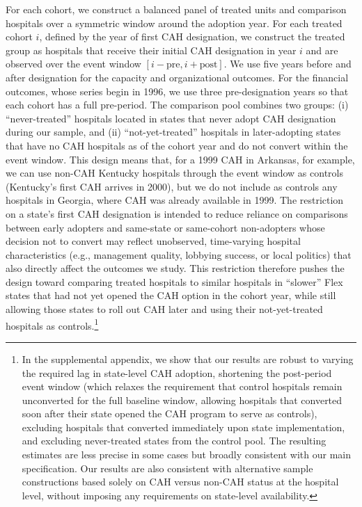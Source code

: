 \documentclass[a4paper, 12pt, twoside]{article}
\begin{document}
For each cohort, we construct a balanced panel of treated units and comparison hospitals over a symmetric window around the adoption year. For each treated cohort $i$, defined by the year of first CAH designation, we construct the treated group as hospitals that receive their initial CAH designation in year $i$ and are observed over the event window $[i-\text{pre}, i+\text{post}]$. We use five years before and after designation for the capacity and organizational outcomes. For the financial outcomes, whose series begin in 1996, we use three pre-designation years so that each cohort has a full pre-period. The comparison pool combines two groups: (i) ``never-treated'' hospitals located in states that never adopt CAH designation during our sample, and (ii) ``not-yet-treated'' hospitals in later-adopting states that have no CAH hospitals as of the cohort year and do not convert within the event window. This design means that, for a 1999 CAH in Arkansas, for example, we can use non-CAH Kentucky hospitals through the event window as controls (Kentucky’s first CAH arrives in 2000), but we do not include as controls any hospitals in Georgia, where CAH was already available in 1999. The restriction on a state's first CAH designation is intended to reduce reliance on comparisons between early adopters and same-state or same-cohort non-adopters whose decision not to convert may reflect unobserved, time-varying hospital characteristics (e.g., management quality, lobbying success, or local politics) that also directly affect the outcomes we study. This restriction therefore pushes the design toward comparing treated hospitals to similar hospitals in ``slower'' Flex states that had not yet opened the CAH option in the cohort year, while still allowing those states to roll out CAH later and using their not-yet-treated hospitals as controls.\footnote{In the supplemental appendix, we show that our results are robust to varying the required lag in state-level CAH adoption, shortening the post-period event window (which relaxes the requirement that control hospitals remain unconverted for the full baseline window, allowing hospitals that converted soon after their state opened the CAH program to serve as controls), excluding hospitals that converted immediately upon state implementation, and excluding never-treated states from the control pool. The resulting estimates are less precise in some cases but broadly consistent with our main specification. Our results are also consistent with alternative sample constructions based solely on CAH versus non-CAH status at the hospital level, without imposing any requirements on state-level availability.}
\end{document}

